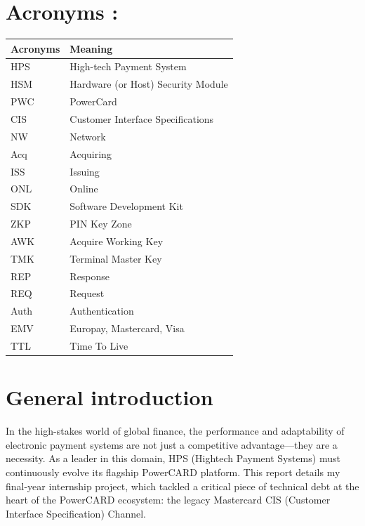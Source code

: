 \documentclass[12pt,a4paper]{report}
\begin{document}
\section{Acronyms :}
\begin{table}[H]
\centering
\renewcommand{\arraystretch}{1.3} %
\begin{tabular}{|p{3cm}|p{10cm}|}
\hline
\textbf{Acronyms} & \textbf{Meaning} \\
\hline
HPS  & High-tech Payment System \\
\hline
HSM  & Hardware (or Host) Security Module \\
\hline
PWC  & PowerCard \\
\hline
CIS  & Customer Interface Specifications \\
\hline
NW   & Network \\
\hline
Acq  & Acquiring \\
\hline
ISS  & Issuing \\
\hline
ONL  & Online \\
\hline
SDK  & Software Development Kit \\
\hline
ZKP  & PIN Key Zone \\
\hline
AWK  & Acquire Working Key \\
\hline
TMK  & Terminal Master Key \\
\hline
REP  & Response \\
\hline
REQ  & Request \\
\hline
Auth & Authentication \\
\hline
EMV  & Europay, Mastercard, Visa \\
\hline
TTL  & Time To Live \\
\hline
\end{tabular}
\end{table}

\clearpage


\tableofcontents
\clearpage


\listoffigures
\clearpage




\section{General introduction}
In the high-stakes world of global finance, the performance and adaptability of electronic payment systems are not just a competitive advantage—they are a necessity. As a leader in this domain, HPS (Hightech Payment Systems) must continuously evolve its flagship PowerCARD platform. This report details my final-year internship project, which tackled a critical piece of technical debt at the heart of the PowerCARD ecosystem: the legacy Mastercard CIS (Customer Interface Specification) Channel.
\end{document}
